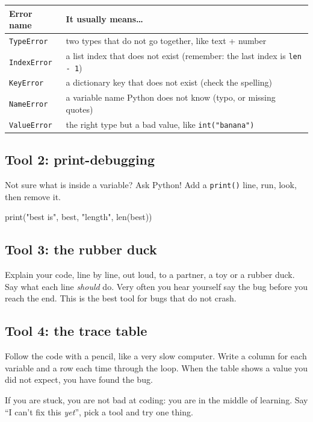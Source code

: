 \begin{center}
\renewcommand{\arraystretch}{1.3}
\begin{tabularx}{\linewidth}{@{}lX@{}}
\toprule
\textbf{Error name} & \textbf{It usually means\ldots} \\ \midrule
\texttt{TypeError} & two types that do not go together, like text + number \\
\texttt{IndexError} & a list index that does not exist (remember: the last index is \texttt{len - 1}) \\
\texttt{KeyError} & a dictionary key that does not exist (check the spelling) \\
\texttt{NameError} & a variable name Python does not know (typo, or missing quotes) \\
\texttt{ValueError} & the right type but a bad value, like \texttt{int("banana")} \\ \bottomrule
\end{tabularx}
\end{center}

\subsection{Tool 2: print-debugging}
Not sure what is inside a variable? Ask Python! Add a \texttt{print()} line, run, look, then remove it.
\begin{pycode}
print("best is", best, "length", len(best))
\end{pycode}

\subsection{Tool 3: the rubber duck}
Explain your code, line by line, out loud, to a partner, a toy or a rubber duck. Say what each line \emph{should} do.
Very often you hear yourself say the bug before you reach the end. This is the best tool for bugs that do not crash.

\subsection{Tool 4: the trace table}
Follow the code with a pencil, like a very slow computer. Write a column for each variable and a row each time through the loop.
When the table shows a value you did not expect, you have found the bug.

\begin{tip}
If you are stuck, you are not bad at coding: you are in the middle of learning. Say \enquote{I can't fix this \emph{yet}}, pick a tool and try one thing.
\end{tip}

